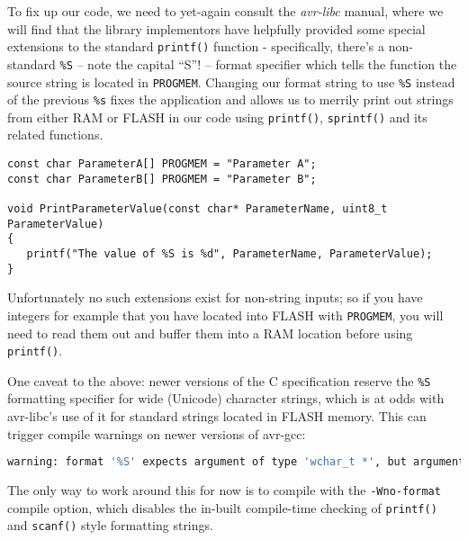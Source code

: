 \documentclass[a4paper,oneside,notitlepage]{book}
\begin{document}
To fix up our code, we need to yet-again consult the \textit{avr-libc} manual, where we will find that the library implementors have helpfully provided some special extensions to the standard \lstinline{printf()} function - specifically, there's a non-standard \lstinline{%S} -- note the capital ``S''! -- format specifier which tells the function the source string is located in \lstinline{PROGMEM}. Changing our format string to use \lstinline{%S} instead of the previous \lstinline{%s} fixes the application and allows us to merrily print out strings from either RAM or FLASH in our code using \lstinline{printf()}, \lstinline{sprintf()} and its related functions.

\begin{center}
\begin{lstlisting}
const char ParameterA[] PROGMEM = "Parameter A";
const char ParameterB[] PROGMEM = "Parameter B";

void PrintParameterValue(const char* ParameterName, uint8_t ParameterValue)
{
   printf("The value of %S is %d", ParameterName, ParameterValue);
}
\end{lstlisting}
\end{center}

Unfortunately no such extensions exist for non-string inputs; so if you have integers for example that you have located into FLASH with \lstinline{PROGMEM}, you will need to read them out and buffer them into a RAM location before using \lstinline{printf()}.

One caveat to the above: newer versions of the C specification reserve the \lstinline{%S} formatting specifier for wide (Unicode) character strings, which is at odds with avr-libc's use of it for standard strings located in FLASH memory. This can trigger compile warnings on newer versions of avr-gcc:

\begin{center}
\begin{lstlisting}[language=bash]
warning: format '%S' expects argument of type 'wchar_t *', but argument 2 has type 'const char *' [-Wformat=]
\end{lstlisting}
\end{center}

The only way to work around this for now is to compile with the \lstinline{-Wno-format} compile option, which disables the in-built compile-time checking of \lstinline{printf()} and \lstinline{scanf()} style formatting strings.
\end{document}
